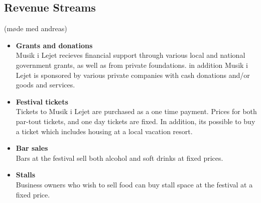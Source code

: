 \subsection{Revenue Streams} %
\label{sub:revenue_streams}
(møde med andreas)
\begin{itemize}
	\item \textbf{Grants and donations}\\
	Musik i Lejet recieves financial support through various local and national government grants, as well as from private foundations. in addition Musik i Lejet is sponsored by various private companies with cash donations and/or goods and services.
	\item \textbf{Festival tickets}\\
	Tickets to Musik i Lejet are purchased as a one time payment. Prices for both par-tout tickets, and one day tickets are fixed. In addition, its possible to buy a ticket which includes housing at a local vacation resort.
	\item \textbf{Bar sales}\\
	Bars at the festival sell both alcohol and soft drinks at fixed prices.
	\item \textbf{Stalls}\\
	Business owners who wish to sell food can buy stall space at the festival at a fixed price.
\end{itemize}

